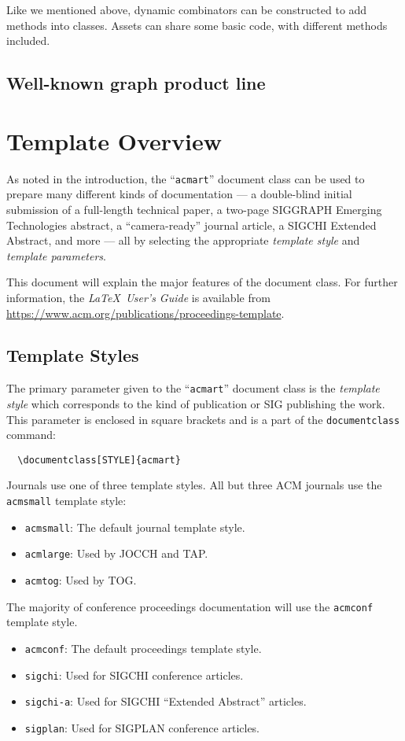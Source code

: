 \documentclass[sigconf]{acmart}
\begin{document}
Like we mentioned above, dynamic combinators can be constructed to add methods into classes. Assets can share
some basic code, with different methods included.

\subsection{Well-known graph product line}




\section{Template Overview}
As noted in the introduction, the ``\verb|acmart|'' document class can be used to prepare many different kinds of documentation --- a double-blind initial submission of a full-length technical paper, a two-page SIGGRAPH Emerging Technologies abstract, a ``camera-ready'' journal article, a SIGCHI Extended Abstract, and more --- all by selecting the appropriate {\it template style} and {\it template parameters}.

This document will explain the major features of the document class. For further information, the {\it \LaTeX\ User's Guide} is available from \url{https://www.acm.org/publications/proceedings-template}.

\subsection{Template Styles}

The primary parameter given to the ``\verb|acmart|'' document class is the {\it template style} which corresponds to the kind of publication or SIG publishing the work. This parameter is enclosed in square brackets and is a part of the {\verb|documentclass|} command:
\begin{verbatim}
  \documentclass[STYLE]{acmart}
\end{verbatim}

Journals use one of three template styles. All but three ACM journals use the {\verb|acmsmall|} template style:
\begin{itemize}
\item {\verb|acmsmall|}: The default journal template style.
\item {\verb|acmlarge|}: Used by JOCCH and TAP.
\item {\verb|acmtog|}: Used by TOG.
\end{itemize}

The majority of conference proceedings documentation will use the {\verb|acmconf|} template style.
\begin{itemize}
\item {\verb|acmconf|}: The default proceedings template style.
\item{\verb|sigchi|}: Used for SIGCHI conference articles.
\item{\verb|sigchi-a|}: Used for SIGCHI ``Extended Abstract'' articles.
\item{\verb|sigplan|}: Used for SIGPLAN conference articles.
\end{itemize}
\end{document}
